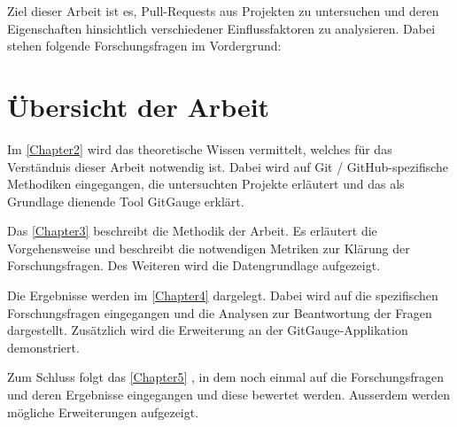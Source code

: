Ziel dieser Arbeit ist es, Pull-Requests aus Projekten zu untersuchen und deren Eigenschaften hinsichtlich verschiedener Einflussfaktoren zu analysieren. Dabei stehen folgende Forschungsfragen im Vordergrund:








\section{Übersicht der Arbeit}
Im \autoref{Chapter2} \textit{} wird das theoretische Wissen vermittelt, welches für das Verständnis dieser Arbeit notwendig ist. Dabei wird auf  Git / GitHub-spezifische Methodiken eingegangen, die untersuchten Projekte erläutert und das als Grundlage dienende Tool GitGauge erklärt.

Das \autoref{Chapter3} \textit{} beschreibt die Methodik der Arbeit. Es erläutert die Vorgehensweise und beschreibt die notwendigen Metriken zur Klärung der Forschungsfragen. Des Weiteren wird die Datengrundlage aufgezeigt.


Die Ergebnisse werden im \autoref{Chapter4} \textit{} dargelegt. Dabei wird auf die spezifischen Forschungsfragen eingegangen und die Analysen zur Beantwortung der Fragen dargestellt. Zusätzlich wird die Erweiterung an der GitGauge-Applikation demonstriert.

Zum Schluss folgt das \autoref{Chapter5} \textit{}, in dem noch einmal auf die Forschungsfragen und deren Ergebnisse eingegangen und diese bewertet werden. Ausserdem werden mögliche Erweiterungen aufgezeigt.






